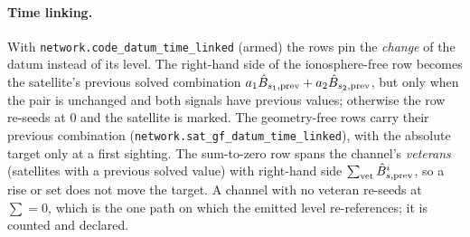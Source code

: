 \documentclass[main.tex]{subfiles}
\begin{document}
\paragraph{Time linking.}
With \texttt{network.code\_datum\_time\_linked} (armed) the rows pin the
\emph{change} of the datum instead of its level. The right-hand side of
the ionosphere-free row becomes the satellite's previous solved
combination $a_1\hat{B}_{s_1,\text{prev}}
+ a_2\hat{B}_{s_2,\text{prev}}$, but only when the pair is
unchanged and both signals have previous values; otherwise the row
re-seeds at $0$ and the satellite is marked. The geometry-free rows
carry their previous combination
(\texttt{network.sat\_gf\_datum\_time\_linked}), with the absolute target
only at a first sighting. The sum-to-zero row spans the channel's
\emph{veterans} (satellites with a previous solved value) with right-hand
side $\sum_{\text{vet}}\hat{B}^i_{s,\text{prev}}$, so a
rise or set does not move the target. A channel with no veteran
re-seeds at $\sum = 0$, which is the one path on which the emitted level
re-references; it is counted and declared.
\end{document}
